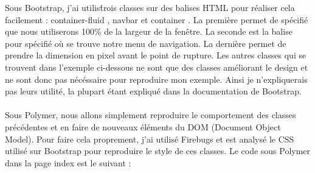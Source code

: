 \documentclass{article}
\begin{document}
Sous Bootstrap, j'ai utilis\' trois classes sur des balises HTML pour r\'ealiser cela facilement : \og container-fluid \fg{}, \og navbar \fg{} et \og container \fg{}. La premi\`ere permet de sp\'ecifi\'e que nous utiliserons 100\% de la largeur de la fen\^etre. La seconde est la balise pour sp\'ecifi\'e o\`u se trouve notre menu de navigation. La derni\`ere permet de prendre la dimension en pixel avant le point de rupture. Les autres classes qui se trouvent dans l'exemple ci-dessous ne sont que des classes am\'eliorant le design et ne sont donc pas n\'ec\'essaire pour reproduire mon exemple. Ainsi je n'expliquerais pas leurs utilit\'e, la plupart \'etant expliqu\'e dans la documentation de Bootstrap. 
\vspace{0.5cm}\\
\vspace{0.5cm}\\
Sous Polymer, nous allons simplement reproduire le comportement des classes pr\'ec\'edentes et en faire de nouveaux \'el\'ements   du DOM (Document Object Model). Pour faire cela proprement, j'ai utilis\'e Firebugs et est analys\'e le CSS utilis\'e sur Bootstrap pour reproduire le style de ces classes. Le code sous Polymer dans la page index est le suivant :
\vspace{0.5cm}\\
\end{document}
